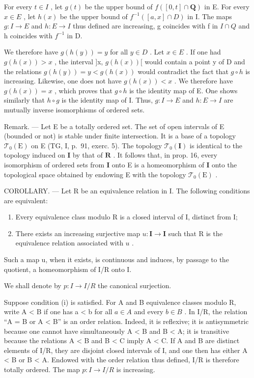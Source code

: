 For every \(t \in I\) , let \(g(t)\) be the upper bound of \(f([0, t] \cap \mathbf{Q})\) in E. For every \(x \in E\) , let \(h(x)\) be the upper bound of \(f^{-1}([a, x] \cap D)\) in I. The maps \(g: I \to E\) and \(h: E \to I\) thus defined are increasing, g coincides with f in \(I \cap Q\) and h coincides with \(f^{-1}\) in D.

We therefore have \(g(h(y)) = y\) for all \(y \in D\) . Let \(x \in E\) . If one had \(g(h(x)) > x\) , the interval {]}x, \(g(h(x))[\) would contain a point y of D and the relations \(g(h(y)) = y < g(h(x))\) would contradict the fact that \(g \circ h\) is increasing. Likewise, one does not have \(g(h(x)) < x\) . We therefore have \(g(h(x)) = x\) , which proves that \(g \circ h\) is the identity map of E. One shows similarly that \(h \circ g\) is the identity map of I. Thus, \(g: I \to E\) and \(h: E \to I\) are mutually inverse isomorphisms of ordered sets.

Remark. --- Let E be a totally ordered set. The set of open intervals of E (bounded or not) is stable under finite intersection. It is a base of a topology \(\mathcal{T}_{0}(\mathrm{E})\) on E (TG, I, p.~91, exerc. 5). The topology \(\mathcal{T}_{0}(\mathbf{I})\) is identical to the topology induced on \(\mathbf{I}\) by that of \(\mathbf{R}\) . It follows that, in prop. 16, every isomorphism of ordered sets from \(\mathbf{I}\) onto E is a homeomorphism of \(\mathbf{I}\) onto the topological space obtained by endowing E with the topology \(\mathcal{T}_{0}(\mathrm{E})\) .

COROLLARY. --- Let R be an equivalence relation in I. The following conditions are equivalent:

\begin{enumerate}
\def\labelenumi{(\roman{enumi})}
\item
  Every equivalence class modulo R is a closed interval of I, distinct from I;
\item
  There exists an increasing surjective map \(u\colon\mathbf{I}\to\mathbf{I}\) such that R is the equivalence relation associated with \(u\) .
\end{enumerate}

Such a map u, when it exists, is continuous and induces, by passage to the quotient, a homeomorphism of I/R onto I.

We shall denote by \(p: I \rightarrow I/R\) the canonical surjection.

Suppose condition (i) is satisfied. For A and B equivalence classes modulo R, write A \textless{} B if one has a \textless{} b for all \(a \in A\) and every \(b \in B\) . In I/R, the relation “A = B or A \textless{} B” is an order relation. Indeed, it is reflexive; it is antisymmetric because one cannot have simultaneously A \textless{} B and B \textless{} A; it is transitive because the relations A \textless{} B and B \textless{} C imply A \textless{} C. If A and B are distinct elements of I/R, they are disjoint closed intervals of I, and one then has either A \textless{} B or B \textless{} A. Endowed with the order relation thus defined, I/R is therefore totally ordered. The map \(p: I \to I/R\) is increasing.

